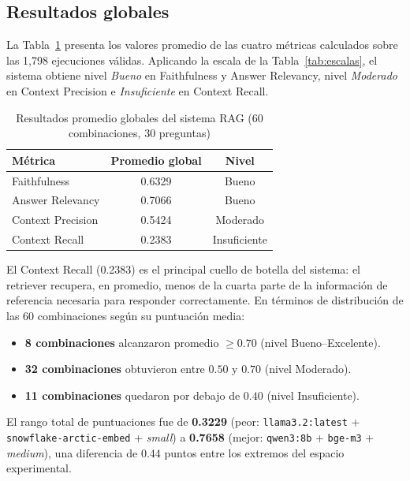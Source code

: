 \documentclass{article}
\begin{document}
\subsection{Resultados globales}

La Tabla~\ref{tab:global} presenta los valores promedio de las cuatro métricas
calculados sobre las 1,798 ejecuciones válidas. Aplicando la escala de la
Tabla~\ref{tab:escalas}, el sistema obtiene nivel \textit{Bueno} en
Faithfulness y Answer Relevancy, nivel \textit{Moderado} en Context Precision e
\textit{Insuficiente} en Context Recall.

\begin{table}[H]
\centering
\begin{tabular}{|l|c|c|}
\hline
\textbf{Métrica} & \textbf{Promedio global} & \textbf{Nivel} \\
\hline
Faithfulness      & 0.6329 & Bueno \\
Answer Relevancy  & 0.7066 & Bueno \\
Context Precision & 0.5424 & Moderado \\
Context Recall    & 0.2383 & Insuficiente \\
\hline
\end{tabular}
\caption{Resultados promedio globales del sistema RAG (60 combinaciones, 30 preguntas)}
\label{tab:global}
\end{table}

El Context Recall (0.2383) es el principal cuello de botella del sistema: el
retriever recupera, en promedio, menos de la cuarta parte de la información de
referencia necesaria para responder correctamente. En términos de distribución
de las 60 combinaciones según su puntuación media:

\begin{itemize}
\item \textbf{8 combinaciones} alcanzaron promedio $\geq 0.70$ (nivel Bueno--Excelente).
\item \textbf{32 combinaciones} obtuvieron entre $0.50$ y $0.70$ (nivel Moderado).
\item \textbf{11 combinaciones} quedaron por debajo de $0.40$ (nivel Insuficiente).
\end{itemize}

El rango total de puntuaciones fue de \textbf{0.3229} (peor: \texttt{llama3.2:latest}
+ \texttt{snowflake-arctic-embed} + \textit{small}) a \textbf{0.7658} (mejor:
\texttt{qwen3:8b} + \texttt{bge-m3} + \textit{medium}), una diferencia de 0.44
puntos entre los extremos del espacio experimental.
\end{document}
